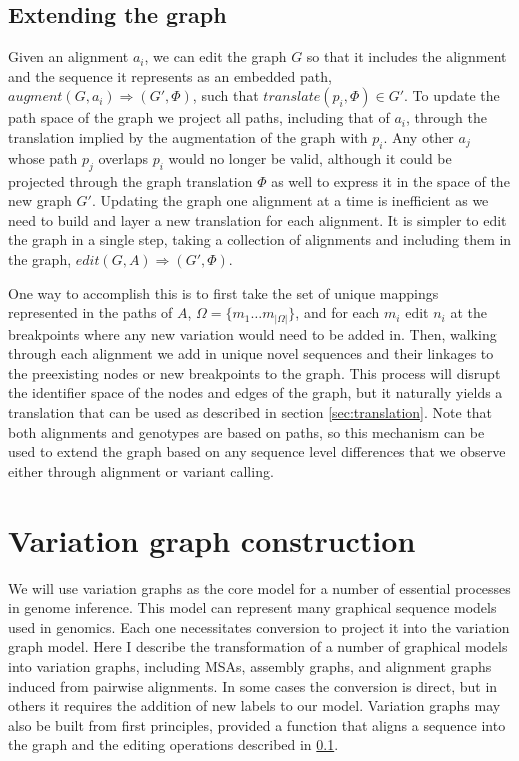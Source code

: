 \subsection{Extending the graph}
\label{sec:extending}

Given an alignment $a_i$, we can edit the graph $G$ so that it includes the alignment and the sequence it represents as an embedded path, $augment(G, a_i) \Rightarrow (G', \Phi)$, such that $translate(p_i, \Phi) \in G'$.
To update the path space of the graph we project all paths, including that of $a_i$, through the translation implied by the augmentation of the graph with $p_i$.
Any other $a_j$ whose path $p_j$ overlaps $p_i$ would no longer be valid, although it could be projected through the graph translation $\Phi$ as well to express it in the space of the new graph $G'$.
Updating the graph one alignment at a time is inefficient as we need to build and layer a new translation for each alignment.
It is simpler to edit the graph in a single step, taking a collection of alignments and including them in the graph, $edit(G, A) \Rightarrow (G', \Phi)$.

One way to accomplish this is to first take the set of unique mappings represented in the paths of $A$, $\Omega = \{ m_1 \ldots m_{|\Omega|}\}$, and for each $m_i$ edit $n_i$ at the breakpoints where any new variation would need to be added in.
Then, walking through each alignment we add in unique novel sequences and their linkages to the preexisting nodes or new breakpoints to the graph.
This process will disrupt the identifier space of the nodes and edges of the graph, but it naturally yields a translation that can be used as described in section \ref{sec:translation}.
Note that both alignments and genotypes are based on paths, so this mechanism can be used to extend the graph based on any sequence level differences that we observe either through alignment or variant calling.

\section{Variation graph construction}

We will use variation graphs as the core model for a number of essential processes in genome inference.
This model can represent many graphical sequence models used in genomics.
Each one necessitates conversion to project it into the variation graph model.
Here I describe the transformation of a number of graphical models into variation graphs, including MSAs, assembly graphs, and alignment graphs induced from pairwise alignments.
In some cases the conversion is direct, but in others it requires the addition of new labels to our model.
Variation graphs may also be built from first principles, provided a function that aligns a sequence into the graph and the editing operations described in \ref{sec:extending}.

